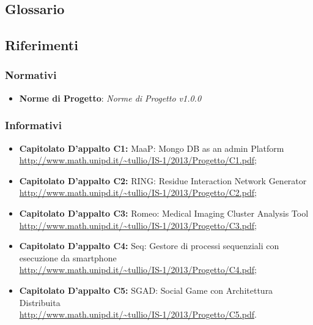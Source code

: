 \subsection{Glossario}
\label{glossario}
\glossIntro{}
\subsection{Riferimenti}
\label{riferimenti}

\subsubsection{Normativi}
\label{rifnormativi}
\begin{itemize}
\item\textbf{Norme di Progetto}: \textit{Norme di Progetto v1.0.0}
\end{itemize}

\subsubsection{Informativi}
\label{rifinformativi}
\begin{itemize}
\item \textbf{Capitolato D'appalto C1:}
MaaP: Mongo DB as an admin Platform
\\ \url{http://www.math.unipd.it/~tullio/IS-1/2013/Progetto/C1.pdf};

\item \textbf{Capitolato D'appalto C2:}
RING: Residue Interaction Network Generator
\\ \url{http://www.math.unipd.it/~tullio/IS-1/2013/Progetto/C2.pdf};

\item \textbf{Capitolato D'appalto C3:}
Romeo: Medical Imaging Cluster Analysis Tool
\\ \url{http://www.math.unipd.it/~tullio/IS-1/2013/Progetto/C3.pdf};

\item \textbf{Capitolato D'appalto C4:}
Seq: Gestore di processi sequenziali con esecuzione da smartphone
\\ \url{http://www.math.unipd.it/~tullio/IS-1/2013/Progetto/C4.pdf};

\item \textbf{Capitolato D'appalto C5:}
SGAD: Social Game con Architettura Distribuita
\\ \url{http://www.math.unipd.it/~tullio/IS-1/2013/Progetto/C5.pdf}.
\end{itemize}